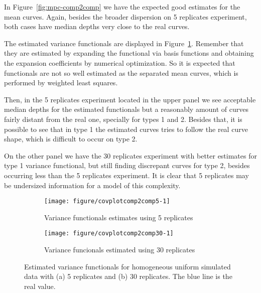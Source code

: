 In Figure~\ref{fig:mpc-comp2comp} we have the expected good estimates for the mean curves. Again, besides the broader dispersion on 5 replicates experiment, both cases have median depths very close to the real curves.

The estimated variance functionals are displayed in Figure~\ref{fig:covplotcomp2comp}. Remember that they are estimated by expanding the functional via basis functions and obtaining the expansion coefficients by numerical optimization. So it is expected that functionals are not so well estimated as the separated mean curves, which is performed by weighted least squares.

Then, in the 5 replicates experiment located in the upper panel we see acceptable median depths for the estimated functionals but a reasonably amount of curves fairly distant from the real one, specially for types 1 and 2. Besides that, it is possible to see that in type 1 the estimated curves tries to follow the real curve shape, which is difficult to occur on type 2. 

On the other panel we have the 30 replicates experiment with better estimates for type 1 variance functional, but still finding discrepant curves for type 2, besides occurring less than the 5 replicates experiment. It is clear that 5 replicates may be undersized information for a model of this complexity.



\begin{figure}[t]
  \centering
  \begin{subfigure}{\textwidth}
    \centering
\begin{knitrout}
\color{fgcolor}
\texttt{[image: figure/covplotcomp2comp5-1]} 

\end{knitrout}
    \caption{Variance functionals estimates using 5 replicates}
  \end{subfigure}
  \begin{subfigure}{\textwidth}
    \centering
\begin{knitrout}
\color{fgcolor}
\texttt{[image: figure/covplotcomp2comp30-1]} 

\end{knitrout}
    \caption{Variance funcionals estimated using 30 replicates}
  \end{subfigure}
  \caption{Estimated variance functionals for homogeneous uniform simulated data with (a) 5 replicates and (b) 30 replicates. The blue line is the real value.}
  \label{fig:covplotcomp2comp}
\end{figure}

